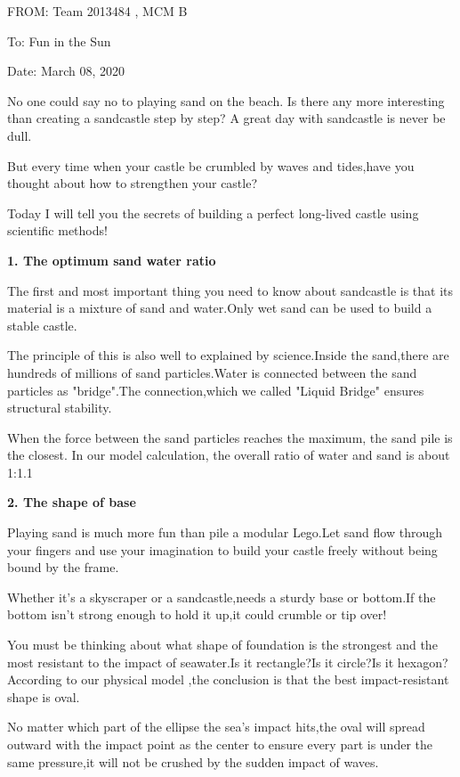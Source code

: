 \documentclass[13pt]{ctexart}
\begin{document}
	\vspace{1cm}
	\noindent FROM: Team {} 2013484 , MCM B
	
	\noindent To: Fun in the Sun
	
	\noindent Date: March 08, 2020
	
	\vspace{10pt}
	\fontsize{13}{12.5}\selectfont
	No one could say no to playing sand on the beach. Is there any more interesting than creating a sandcastle step by step? A great day with sandcastle is never be dull.
	
	But every time when your castle be crumbled by waves and tides,have you thought about how to strengthen your castle?
	
	Today I will tell you the secrets of building a perfect long-lived castle using scientific methods!
	
	\textbf{1. The optimum sand water ratio}
	
	The first and most important thing you need to know about sandcastle is that its material is a mixture of sand and water.Only wet sand can be used to build a stable castle.
	
	The principle of this is also well to explained by science.Inside the sand,there are hundreds of millions of sand particles.Water is connected between the sand particles as "bridge".The connection,which we called "Liquid Bridge" ensures structural stability.
	
	When the force between the sand particles reaches the maximum, the sand pile is the closest. In our model calculation, the overall ratio of water and sand is about 1:1.1
	
	\textbf{2. The shape of base}
	
	Playing sand is much more fun than pile a modular Lego.Let sand flow through your fingers and use your imagination to build your castle freely without being bound by the frame.
	
	Whether it's a skyscraper or a sandcastle,needs a sturdy base or bottom.If the bottom isn't strong enough to hold it up,it could crumble or tip over!
	
	You must be thinking about what shape of foundation is the strongest and  the most resistant to the impact of seawater.Is it rectangle?Is it circle?Is it hexagon?
	According to our physical model ,the conclusion is that the best impact-resistant shape is oval.
	
	No matter which part of the ellipse the sea's impact hits,the oval will spread outward with the impact point as the center to ensure every part is under the same pressure,it will not be crushed by the sudden impact of waves.
	
\end{document}

